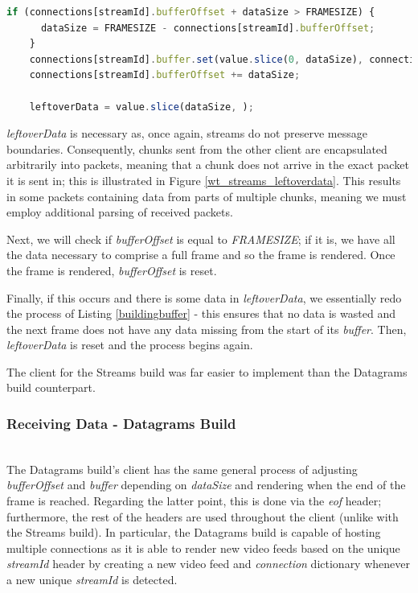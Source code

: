 \begin{lstlisting}[language=javascript, caption={Streams build's client building up the buffer.}, label=buildingbuffer]
    if (connections[streamId].bufferOffset + dataSize > FRAMESIZE) {
      dataSize = FRAMESIZE - connections[streamId].bufferOffset; 
    }
    connections[streamId].buffer.set(value.slice(0, dataSize), connections[streamId].bufferOffset);
    connections[streamId].bufferOffset += dataSize;

    leftoverData = value.slice(dataSize, );
\end{lstlisting}

\textit{leftoverData} is necessary as, once again, streams do not preserve message boundaries. Consequently, chunks sent from the other client are encapsulated arbitrarily into packets, meaning that a chunk does not arrive in the exact packet it is sent in; this is illustrated in Figure \ref{wt_streams_leftoverdata}. This results in some packets containing data from parts of multiple chunks, meaning we must employ additional parsing of received packets. 

Next, we will check if \textit{bufferOffset} is equal to \textit{FRAMESIZE}; if it is, we have all the data necessary to comprise a full frame and so the frame is rendered. Once the frame is rendered, \textit{bufferOffset} is reset.

Finally, if this occurs and there is some data in \textit{leftoverData}, we essentially redo the process of Listing  \ref{buildingbuffer} - this ensures that no data is wasted and the next frame does not have any data missing from the start of its \textit{buffer}. Then, \textit{leftoverData} is reset and the process begins again.

The client for the Streams build was far easier to implement than the Datagrams build counterpart.
\hfill\\
\subsubsection{Receiving Data - Datagrams Build}
\hfill\\
The Datagrams build's client has the same general process of adjusting \textit{bufferOffset} and \textit{buffer} depending on \textit{dataSize} and rendering when the end of the frame is reached. Regarding the latter point, this is done via the \textit{eof} header; furthermore, the rest of the headers are used throughout the client (unlike with the Streams build). In particular, the Datagrams build is capable of hosting multiple connections as it is able to render new video feeds based on the unique \textit{streamId} header by creating a new video feed and \textit{connection} dictionary whenever a new unique \textit{streamId} is detected.

